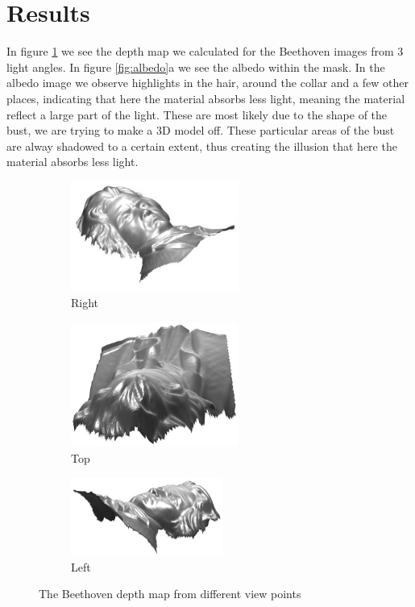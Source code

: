 \documentclass[12pt,a4paper,oneside,final]{article}
\begin{document}
\section{Results}
In figure \ref{fig:BeethovenDepth} we see the depth map we calculated for the Beethoven images from 3 light angles. In figure \ref{fig:albedo}a we see the albedo within the mask. In the albedo image we observe highlights in the hair, around the collar and a few other places, indicating that here the material absorbs less light, meaning the material reflect a large part of the light. These are most likely due to the shape of the bust, we are trying to make a 3D model off. These particular areas of the bust are alway shadowed to a certain extent, thus creating the illusion that here the material absorbs less light. 
\begin{figure}[H]
	\centering
	\begin{subfigure}{.33\textwidth}
		\centering
		\includegraphics[width=5.5cm]{Beethoven1}
		\caption{Right}
	\end{subfigure}%
	\begin{subfigure}{.33\textwidth}
		\centering
		\includegraphics[width=5.5cm]{Beethoven2}
		\caption{Top}
	\end{subfigure}%
	\begin{subfigure}{.33\textwidth}
		\centering
		\includegraphics[width=5cm]{Beethoven3}
		\caption{Left}
	\end{subfigure}
	\caption{The Beethoven depth map from different view points}
	\label{fig:BeethovenDepth}
\end{figure}
\end{document}
